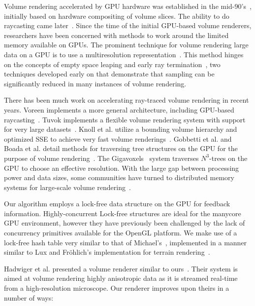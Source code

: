 Volume rendering accelerated by GPU hardware was established in the
mid-90's~\cite{Cullip:1993:AVRW, Cabral:1994:AVRA}, initially based on
hardware compositing of volume slices.  The ability to do raycasting
came later~\cite{Krueger:2003:ATGV}.  Since the time of the initial
GPU-based volume renderers, researchers have been concerned with
methods to work around the limited memory available on GPUs.  The
prominent technique for volume rendering large data on a GPU is to use
a multiresolution
representation~\cite{Boada:2001:Multires, LaMar:2000:Multires,
Weiler:2000:LoD}.  This method hinges on the concepts of empty space
leaping and early ray termination~\cite{Levoy:EarlyTermination}, two
techniques developed early on that demonstrate that sampling can be
significantly reduced in many instances of volume rendering.

There has been much work on accelerating ray-traced volume rendering in
recent years.  Voreen implements a more general architecture,
including GPU-based raycasting~\cite{Voreen:2009}.  Tuvok implements a
flexible volume rendering system with support for very large
datasets~\cite{Fogal:2010:Tuvok, Fogal:2009:SizeMatters}.  Knoll et al.
utilize a bounding volume hierarchy and optimized SSE to achieve very
fast
volume renderings~\cite{Knoll:2010:BVH}.  Gobbetti et al. and Boada et
al. detail methods for traversing tree structures on the GPU for
the purpose of volume rendering~\cite{Gobbetti:2008:VR,
Boada:2001:Octree}.
The Gigavoxels~\cite{Crassin:2009:Gigavoxels} system traverses
$N^3$-trees on the GPU to choose an effective resolution.  With the
large gap between processing power and data sizes, some communities
have turned to distributed memory systems for large-scale
volume rendering~\cite{Childs:2006:ScalableVR, Howison:2010:MPIHybrid,
Fogal:2010:HPG, Beyer:2012:DSM}.

Our algorithm employs a lock-free data structure on the GPU for
feedback information.  Highly-concurrent Lock-free structures are ideal
for the manycore GPU environment, however they have previously been
challenged by the lack of concurrency primitives available for the
OpenGL platform.  We make use of a lock-free hash table very similar to
that of Michael's~\cite{Michael:2002:LockFreeHT}, implemented in a
manner similar to Lux and Fr\"ohlich's implementation for terrain
rendering~\cite{Lux:2011:RCHeight}.

Hadwiger et al. presented a volume renderer similar to
ours~\cite{Hadwiger:2012:Guided}.  Their system is aimed at volume
rendering highly anisotropic data as it is streamed real-time from a
high-resolution microscope.  Our renderer improves upon theirs in a
number of ways:

